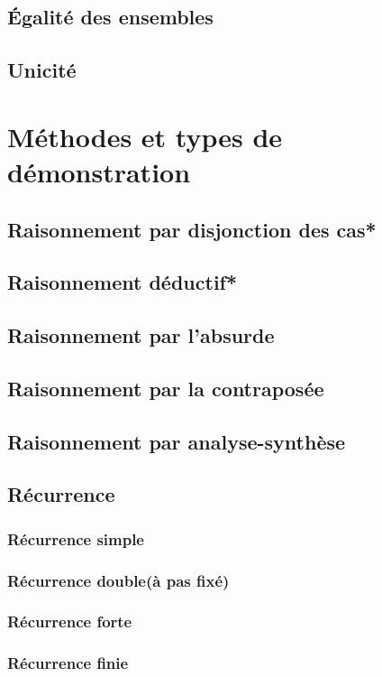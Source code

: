 \documentclass{article}
\begin{document}
\subsection{Égalité des ensembles}



\subsection{Unicité}









\section{Méthodes et types de démonstration}



\subsection{Raisonnement par disjonction des cas*}



\subsection{Raisonnement déductif*}



\subsection{Raisonnement par l'absurde}



\subsection{Raisonnement par la contraposée}



\subsection{Raisonnement par analyse-synthèse}



\subsection{Récurrence}



\subsubsection{Récurrence simple}



\subsubsection{Récurrence double(à pas fixé)}



\subsubsection{Récurrence forte}



\subsubsection{Récurrence finie}
\end{document}

